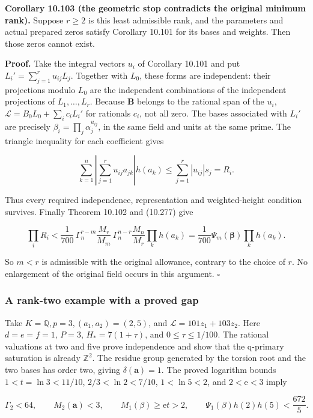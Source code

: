 \documentclass[
  11pt,
  a4paper,
]{article}
\begin{document}
\textbf{Corollary 10.103 (the geometric stop contradicts the original
minimum rank).} Suppose \(r\ge2\) is this least admissible rank, and the
parameters and actual prepared zeros satisfy Corollary 10.101 for its
bases and weights. Then those zeros cannot exist.

\textbf{Proof.} Take the integral vectors \(u_i\) of Corollary 10.101
and put \(L_i'=\sum_{j=1}^ru_{ij}L_j\). Together with \(L_0\), these
forms are independent: their projections modulo \(L_0\) are the
independent combinations of the independent projections of
\(L_1,\ldots,L_r\). Because \(\boldsymbol B\) belongs to the rational
span of the \(u_i\), \(\mathcal L=B_0L_0+\sum_ic_iL_i'\) for rationals
\(c_i\), not all zero. The bases associated with \(L_i'\) are precisely
\(\beta_i=\prod_j\alpha_j^{u_{ij}}\), in the same field and units at the
same prime. The triangle inequality for each coefficient gives

\[
\sum_{k=1}^n\left|\sum_{j=1}^ru_{ij}a_{jk}\right|h(a_k)
\le\sum_{j=1}^r|u_{ij}|s_j=R_i.
\]

Thus every required independence, representation and weighted-height
condition survives. Finally Theorem 10.102 and (10.277) give

\[
\prod_iR_i<\frac1{700}\,
\Gamma_n^{r-m}\frac{M_r}{M_m}\,
\Gamma_n^{n-r}\frac{M_n}{M_r}\prod_kh(a_k)
=\frac1{700}\Psi_m(\boldsymbol\beta)\prod_kh(a_k).
\]

So \(m<r\) is admissible with the original allowance, contrary to the
choice of \(r\). No enlargement of the original field occurs in this
argument. \(\square\)

\subsubsection{A rank-two example with a proved
gap}\label{a-rank-two-example-with-a-proved-gap}

Take \(K=\mathbb Q,p=3,(a_1,a_2)=(2,5)\), and
\(\mathcal L=101z_1+103z_2\). Here \(d=e=f=1\), \(P=3\),
\(H_*=7(1+\tau)\), and \(0\le\tau\le1/100\). The rational valuations at
two and five prove independence and show that the q-primary saturation
is already \(\mathbb Z^2\). The residue group generated by the torsion
root and the two bases has order two, giving
\(\delta(\boldsymbol a)=1\). The proved logarithm bounds
\(1<t=\ln3<11/10\), \(2/3<\ln2<7/10\), \(1<\ln5<2\), and
\(2<\mathrm e<3\) imply

\[
\Gamma_2<64,\qquad M_2(\boldsymbol a)<3,\qquad
M_1(\beta)\ge\mathrm e t>2,
\qquad
\Psi_1(\beta)h(2)h(5)<\frac{672}{5}.
\tag{10.278}
\]
\end{document}
